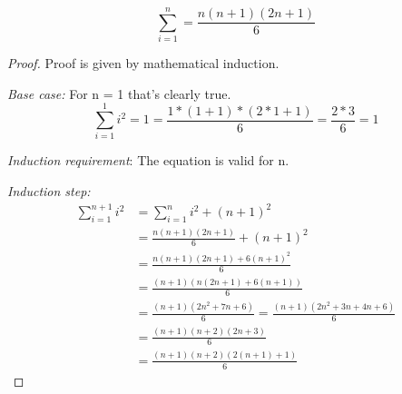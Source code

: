 \begin{lemma}
    \begin{equation}
        \sum_{i=1}^{n} = \frac{n(n+1)(2n+1)}{6}
    \end{equation}
\end{lemma}
\begin{proof}
    Proof is given by mathematical induction.
    
    \emph{Base case:} For n = 1 that's clearly true.
    \begin{equation}
        \sum_{i=1}^{1}i^2 = 1 = \frac{1*(1+1)*(2*1+1)}{6} = \frac{2*3}{6} = 1
    \end{equation}

    \emph{Induction requirement}: The equation is valid for n.

    \emph{Induction step:} 
    \begin{equation}
        \begin{split}
            \sum_{i=1}^{n+1}i^2 & = \sum_{i=1}^{n}i^2 + (n+1)^2 \\
                                & = \frac{n(n+1)(2n+1)}{6} + (n+1)^2 \\
                                & = \frac{n(n+1)(2n+1) + 6(n+1)^2}{6}  \\
                                & = \frac{(n+1)(n(2n+1) + 6(n+1))}{6}  \\
                                & = \frac{(n+1)(2n^2+7n + 6)}{6} = \frac{(n+1)(2n^2+3n+4n+6)}{6} \\
                                & = \frac{(n+1)(n+2)(2n+3)}{6}  \\
                                & = \frac{(n+1)(n+2)(2(n+1)+1)}{6}
        \end{split}
    \end{equation}
\end{proof}